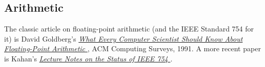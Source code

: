  \subsection{
    \label{Arithmetic}Arithmetic
  }
The classic article on floating-point arithmetic (and the IEEE
  Standard 754 for it) is David Goldberg's 
  \href{http://delivery.acm.org/10.1145/110000/103163/p5-goldberg.pdf?key1=103163$\backslash$\&amp;key2=9533216011$\backslash$\&amp;coll=GUIDE$\backslash$\&amp;dl=ACM$\backslash$\&amp;CFID=36776917$\backslash$\&amp;CFTOKEN=647870}{ \emph{What Every Computer Scientist Should Know About Floating-Point Arithmetic} }, ACM Computing Surveys, 1991. A more recent paper is Kahan's
  \href{http://www.cs.berkeley.edu/~wkahan/ieee754status/ieee754.ps} {\emph{Lecture 
    Notes on the Status of IEEE 754} }.
